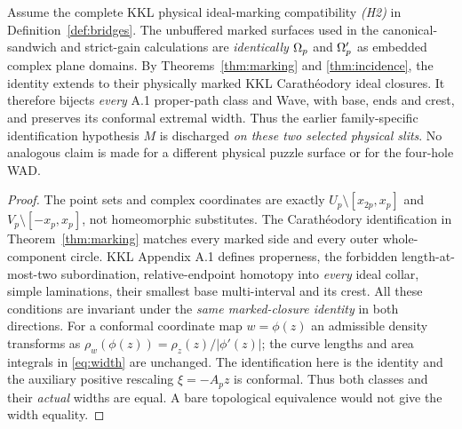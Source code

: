 \begin{lemma}\label{lem:M}
Assume the complete KKL physical ideal-marking
compatibility \emph{(H2)} in
Definition~\ref{def:bridges}.
The unbuffered marked surfaces used in the
canonical-sandwich and strict-gain calculations
are \emph{identically} $\Omega_p$ and $\Omega'_p$ as
embedded complex plane domains.  By
Theorems~\ref{thm:marking} and \ref{thm:incidence},
the identity extends to their physically
marked KKL Carath\'eodory ideal closures.
It therefore bijects \emph{every} A.1
proper-path class and Wave, with base,
ends and crest, and preserves its conformal
extremal width.  Thus the earlier
family-specific identification hypothesis
$M$ is discharged \emph{on these two
selected physical slits}.  No analogous
claim is made for a different physical
puzzle surface or for the four-hole WAD.
\end{lemma}
\begin{proof}
The point sets and complex coordinates
are exactly $U_p\setminus[x_{2p},x_p]$
and $V_p\setminus[-x_p,x_p]$, not
homeomorphic substitutes.  The
Carath\'eodory identification in
Theorem~\ref{thm:marking}
matches every marked side and every
outer whole-component circle.
KKL Appendix A.1 defines properness,
the forbidden length-at-most-two
subordination, relative-endpoint
homotopy into \emph{every} ideal collar,
simple laminations, their smallest
base multi-interval and its crest.
All these conditions are invariant
under the \emph{same marked-closure
identity} in both directions.
For a conformal coordinate map
$w=\phi(z)$ an admissible density
transforms as
$\rho_w(\phi(z))=\rho_z(z)/|\phi'(z)|$;
the curve lengths and area integrals
in \eqref{eq:width} are unchanged.
The identification here is the identity
and the auxiliary positive rescaling
$\xi=-A_pz$ is conformal.
Thus both classes and their
\emph{actual} widths are equal.
A bare topological equivalence
would not give the width equality.
\end{proof}

